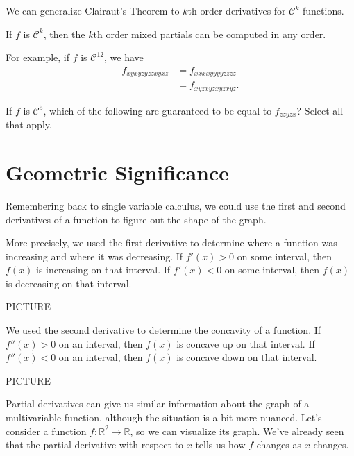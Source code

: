 \documentclass{ximera}
\begin{document}
We can generalize Clairaut's Theorem to $k$th order derivatives for $\mathcal{C}^k$ functions.

\begin{theorem}
If $f$ is $\mathcal{C}^k$, then the $k$th order mixed partials can be computed in any order.
\end{theorem}

For example, if $f$ is $\mathcal{C}^{12}$, we have
\begin{align*}
f_{xyxyzyzzxyxz}&=f_{xxxxyyyyzzzz}\\
&=f_{xyzxyzxyzxyz}.
\end{align*}

\begin{problem}
If $f$ is $\mathcal{C}^5$, which of the following are guaranteed to be equal to $f_{zzyzx}$? Select all that apply,
\begin{selectAll}
\end{selectAll}
\end{problem}

\section{Geometric Significance}

Remembering back to single variable calculus, we could use the first and second derivatives of a function to figure out the shape of the graph.

More precisely, we used the first derivative to determine where a function was increasing and where it was decreasing. If $f'(x)>0$ on some interval, then $f(x)$ is increasing on that interval. If $f'(x)<0$ on some interval, then $f(x)$ is decreasing on that interval.

PICTURE

We used the second derivative to determine the concavity of a function. If $f''(x)>0$ on an interval, then $f(x)$ is concave up on that interval. If $f''(x)<0$ on an interval, then $f(x)$ is concave down on that interval.

PICTURE

Partial derivatives can give us similar information about the graph of a multivariable function, although the situation is a bit more nuanced. Let's consider a function $f:\mathbb{R}^2\rightarrow\mathbb{R}$, so we can visualize its graph. We've already seen that the partial derivative with respect to $x$ tells us how $f$ changes as $x$ changes.
\end{document}
